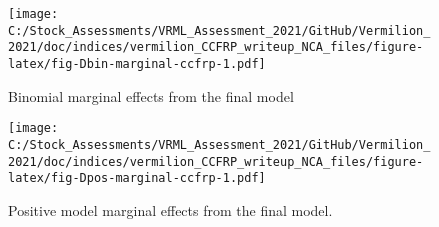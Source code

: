 \documentclass[
]{article}
\begin{document}
\begin{figure}
\centering
\texttt{[image: C:/Stock\_Assessments/VRML\_Assessment\_2021/GitHub/Vermilion\_2021/doc/indices/vermilion\_CCFRP\_writeup\_NCA\_files/figure-latex/fig-Dbin-marginal-ccfrp-1.pdf]}
\caption{\label{fig:fig-Dbin-marginal-ccfrp}Binomial marginal effects from the final model}
\end{figure}

\begin{figure}
\centering
\texttt{[image: C:/Stock\_Assessments/VRML\_Assessment\_2021/GitHub/Vermilion\_2021/doc/indices/vermilion\_CCFRP\_writeup\_NCA\_files/figure-latex/fig-Dpos-marginal-ccfrp-1.pdf]}
\caption{\label{fig:fig-Dpos-marginal-ccfrp}Positive model marginal effects from the final model.}
\end{figure}
\end{document}
